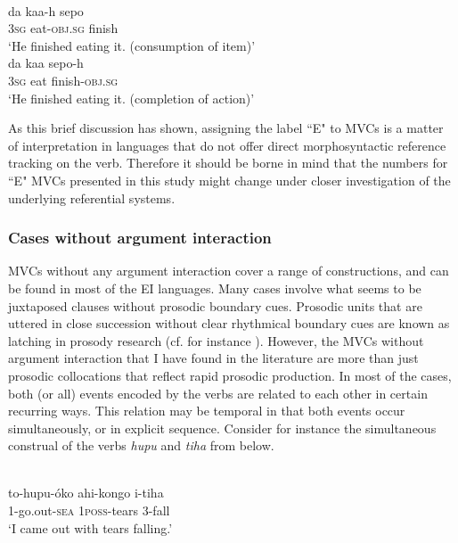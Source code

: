 \ea 
{}\\
\ea \label{Buru4}
\gll da kaa-h sepo \\
3\textsc{sg} eat-\textsc{obj}.\textsc{sg} finish \\
\glft `He finished eating it. (consumption of item)' \\ 
\ex \label{Buru5}
\gll da kaa sepo-h \\ 
3\textsc{sg} eat finish-\textsc{obj}.\textsc{sg} \\
\glft `He finished eating it. (completion of action)'\\ 
\z
\z

As this brief discussion has shown, assigning the label ``E" to MVCs is a matter of interpretation in languages that do not offer direct morphosyntactic reference tracking on the verb. Therefore it should be borne in mind that the numbers for ``E" MVCs presented in this study might change under closer investigation of the underlying referential systems.

\subsubsection{Cases without argument interaction}

MVCs without any argument interaction cover a range of constructions, and can be found in most of the EI languages. Many cases involve what seems to be juxtaposed clauses without prosodic boundary cues. Prosodic units that are uttered in close succession without clear rhythmical boundary cues are known as latching in prosody research (cf. for instance \citealt{himmelmann2018}). However, the MVCs without argument interaction that I have found in the literature are more than just prosodic collocations that reflect rapid prosodic production. In most of the cases, both (or all) events encoded by the verbs are related to each other in certain recurring ways. This relation may be temporal in that both events occur simultaneously, or in explicit sequence.  Consider for instance the simultaneous construal of the verbs \textit{hupu} and \textit{tiha} from  below.

\ea 
{}\\
\gll to-hupu-óko ahi-kongo i-tiha \\
1-go.out-\textsc{sea} 1\textsc{poss}-tears 3-fall \\
\glft `I came out with tears falling.'\\ 
\z

